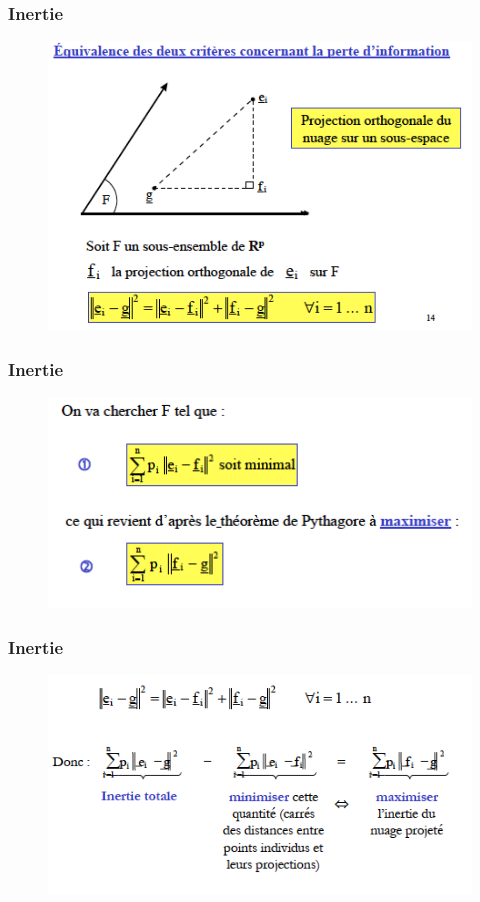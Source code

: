 \documentclass[11pt]{beamer}
\begin{document}
\begin{frame}
\frametitle{Inertie}
\begin{figure}
\includegraphics[scale=0.6]{schema12.png} 
\end{figure}

\end{frame}
\begin{frame}
\frametitle{Inertie}
\begin{figure}
\includegraphics[scale=0.6]{schema13.png} 
\end{figure}

\end{frame}
\begin{frame}
\frametitle{Inertie}
\begin{figure}
\includegraphics[scale=0.6]{schema14.png} 
\end{figure}

\end{frame}
\end{document}
